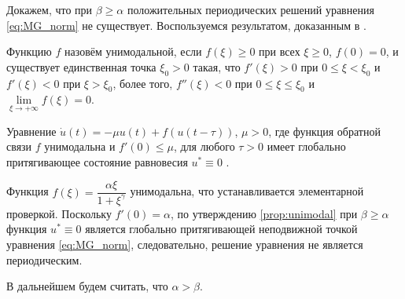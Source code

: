 Докажем, что при $\beta \geq \alpha$ положительных периодических решений уравнения \eqref{eq:MG_norm} не существует. Воспользуемся результатом, доказанным в \cite[Proposition 3.1]{Roest2007}.

\begin{definition}
Функцию $f$ назовём унимодальной, если $f(\xi) \geq 0$ при всех $\xi \geq 0$, $f(0) = 0$, и существует единственная точка $\xi_0 > 0$ такая, что $f'(\xi) > 0$ при $0 \leq \xi < \xi_0$ и $f'(\xi) < 0$ при $\xi > \xi_0$, более того, $f''(\xi) < 0$ при $0 \leq \xi \leq \xi_0$ и $\lim\limits_{\xi \to +\infty} f(\xi) = 0$.
\end{definition}

\begin{proposition}
\label{prop:unimodal}
Уравнение $\dot{u}(t) = -\mu u(t) + f(u(t - \tau))$, $\mu > 0$, где функция обратной связи $f$ унимодальна и $f'(0) \leq \mu$, для любого $\tau > 0$ имеет глобально притягивающее состояние равновесия $u^* \equiv 0$ \cite{Roest2007}.
\end{proposition}
% 
% 
% 

Функция $f(\xi) = \dfrac{\alpha \xi}{1 + \xi^{\gamma}}$ унимодальна, что устанавливается элементарной проверкой. Поскольку $f'(0) = \alpha$, по утверждению \eqref{prop:unimodal} при $\beta \geq \alpha$ функция $u^* \equiv 0$ является глобально притягивающей неподвижной точкой уравнения \eqref{eq:MG_norm}, следовательно, решение уравнения не является периодическим.

В дальнейшем будем считать, что $\alpha > \beta$.

